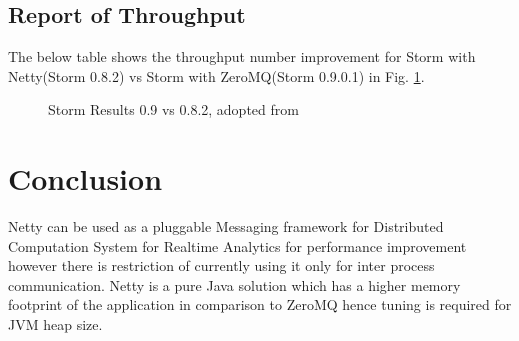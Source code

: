\documentclass[9pt,twocolumn,twoside]{styles/osajnl}
\begin{document}
\subsection{Report of Throughput}
The below table shows the throughput number improvement for Storm with
Netty(Storm 0.8.2) vs Storm with ZeroMQ(Storm 0.9.0.1) in
Fig. \ref{fig:OfStreamsAndStorms}.

\begin{figure}[htbp]
	\centering
	\caption{Storm Results 0.9 vs 0.8.2, adopted from
          \cite[p.~27]{article-nabi2014streams}}
	\label{fig:OfStreamsAndStorms}
\end{figure}



\section{Conclusion}
Netty can be used as a pluggable Messaging framework for Distributed
Computation System for Realtime Analytics for performance improvement
however there is restriction of currently using it only for inter
process communication. Netty is a pure Java solution which has a
higher memory footprint of the application in comparison to ZeroMQ
hence tuning is required for JVM heap size.


 
\end{document}
